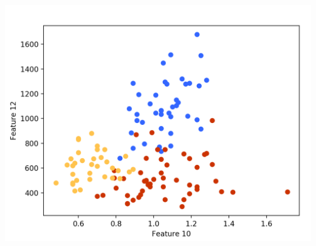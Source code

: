 \documentclass[11pt]{article}
\begin{document}
\begin{center}
\includegraphics[scale=0.3]{features_10_12}
\end{center}
\end{document}
